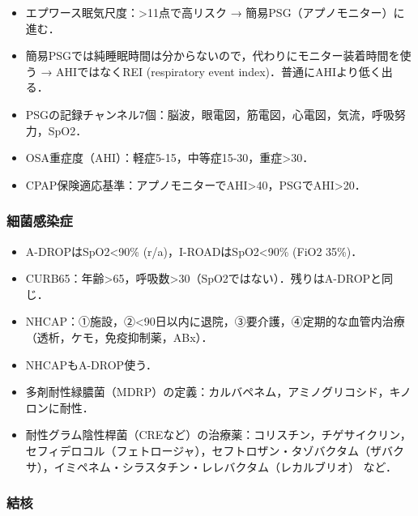 \begin{itemize}
\item エプワース眠気尺度：>11点で高リスク → 簡易PSG（アプノモニター）に進む．


\item 簡易PSGでは純睡眠時間は分からないので，代わりにモニター装着時間を使う → AHIではなくREI (respiratory event index)．普通にAHIより低く出る．
\item PSGの記録チャンネル7個：脳波，眼電図，筋電図，心電図，気流，呼吸努力，SpO2．

\item OSA重症度（AHI）：軽症5-15，中等症15-30，重症>30．
\item CPAP保険適応基準：アプノモニターでAHI>40，PSGでAHI>20．

\end{itemize}

\subsubsection{細菌感染症}

\begin{itemize}

\item A-DROPはSpO2<90\% (r/a)，I-ROADはSpO2<90\% (FiO2 35\%)．
\item CURB65：年齢>65，呼吸数>30（SpO2ではない）．残りはA-DROPと同じ．
\item NHCAP：①施設，②<90日以内に退院，③要介護，④定期的な血管内治療（透析，ケモ，免疫抑制薬，ABx）．
\item NHCAPもA-DROP使う．


\item 多剤耐性緑膿菌（MDRP）の定義：カルバペネム，アミノグリコシド，キノロンに耐性．
\item 耐性グラム陰性桿菌（CREなど）の治療薬：コリスチン，チゲサイクリン，セフィデロコル（フェトロージャ\circledR），セフトロザン・タゾバクタム（ザバクサ\circledR），イミペネム・シラスタチン・レレバクタム（レカルブリオ\circledR）
など．
\end{itemize}

\subsubsection{結核}

